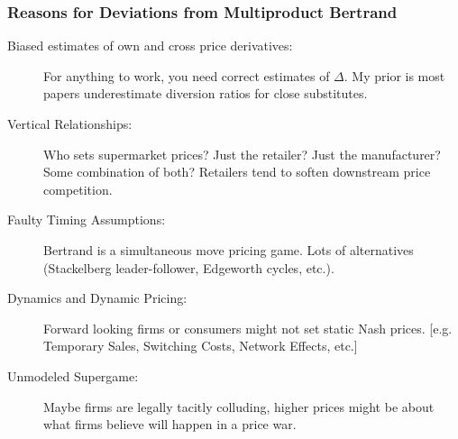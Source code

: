\documentclass[aspectratio=169,10pt]{beamer}
\begin{document}
\begin{frame}
\frametitle{Reasons for Deviations from Multiproduct Bertrand}
\small
\begin{description}
\item[Biased estimates of own and cross price derivatives:] For anything to work, you need correct estimates of $\Delta$. My prior is most papers \alert{underestimate} diversion ratios for close substitutes.
\item[Vertical Relationships:] Who sets supermarket prices? Just the retailer? Just the manufacturer? Some combination of both? Retailers tend to \alert{soften} downstream price competition.
\item[Faulty Timing Assumptions:] Bertrand is a simultaneous move pricing game. Lots of alternatives (Stackelberg leader-follower, Edgeworth cycles, etc.).
\item[Dynamics and Dynamic Pricing:] Forward looking firms or consumers might not set static Nash prices. [e.g. Temporary Sales, Switching Costs, Network Effects, etc.]
\item[Unmodeled Supergame:] Maybe firms are legally tacitly colluding, higher prices might be about what firms believe will happen in a price war.
\end{description}
\end{frame}
\end{document}
